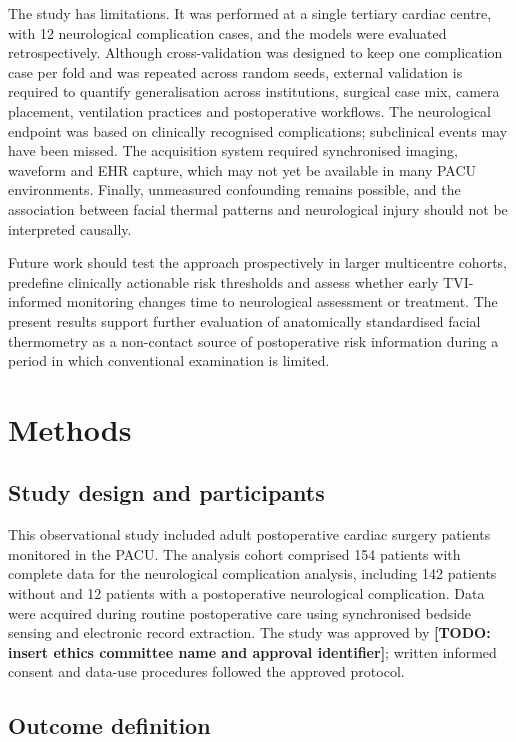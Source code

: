 \documentclass[pdflatex,sn-basic,Numbered]{sn-jnl}
\theoremstyle{thmstyleone}%
\theoremstyle{thmstyletwo}%
\theoremstyle{thmstylethree}%
\begin{document}
The study has limitations. It was performed at a single tertiary cardiac centre, with 12 neurological complication cases, and the models were evaluated retrospectively. Although cross-validation was designed to keep one complication case per fold and was repeated across random seeds, external validation is required to quantify generalisation across institutions, surgical case mix, camera placement, ventilation practices and postoperative workflows. The neurological endpoint was based on clinically recognised complications; subclinical events may have been missed. The acquisition system required synchronised imaging, waveform and EHR capture, which may not yet be available in many PACU environments. Finally, unmeasured confounding remains possible, and the association between facial thermal patterns and neurological injury should not be interpreted causally.

Future work should test the approach prospectively in larger multicentre cohorts, predefine clinically actionable risk thresholds and assess whether early TVI-informed monitoring changes time to neurological assessment or treatment. The present results support further evaluation of anatomically standardised facial thermometry as a non-contact source of postoperative risk information during a period in which conventional examination is limited.

\section{Methods}

\subsection{Study design and participants}

This observational study included adult postoperative cardiac surgery patients monitored in the PACU. The analysis cohort comprised 154 patients with complete data for the neurological complication analysis, including 142 patients without and 12 patients with a postoperative neurological complication. Data were acquired during routine postoperative care using synchronised bedside sensing and electronic record extraction. The study was approved by \textbf{[TODO: insert ethics committee name and approval identifier]}; written informed consent and data-use procedures followed the approved protocol.

\subsection{Outcome definition}
\end{document}
